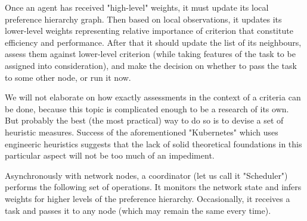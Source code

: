 Once an agent has received "high-level" weights, it must update its local preference hierarchy graph.
Then based on local observations, it updates its lower-level weights representing relative importance of criterion that constitute efficiency and performance.
After that it should update the list of its neighbours, assess them against lower-level criterion (while taking features of the task to be assigned into consideration), and make the decision on whether to pass the task to some other node, or run it now.

We will not elaborate on how exactly assessments in the context of a criteria can be done, because this topic is complicated enough to be a research of its own.
But probably the best (the most practical) way to do so is to devise a set of heuristic measures.
Success of the aforementioned "Kubernetes" which uses engineeric heuristics suggests that the lack of solid theoretical foundations in this particular aspect will not be too much of an impediment.

Asynchronously with network nodes, a coordinator (let us call it "Scheduler") performs the following set of operations. It monitors the network state and infers weights for higher levels of the preference hierarchy. Occasionally, it receives a task and passes it to any node (which may remain the same every time).
